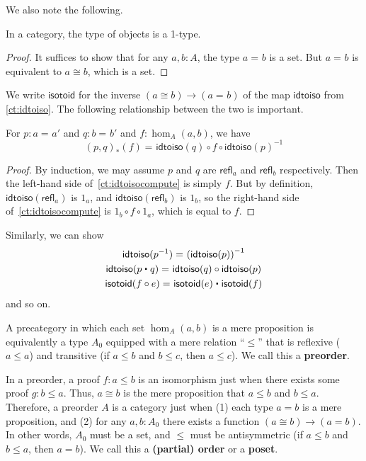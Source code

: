 \documentclass{amsart}
\newcommand{\id}[3][]{\ensuremath{#2 =_{#1} #3}\xspace}
\newcommand{\refl}[1]{\ensuremath{\mathsf{refl}_{#1}}\xspace}
\newcommand{\ct}{\mathrel{\raisebox{.5ex}{$\centerdot$}}}
\newcommand{\opp}[1]{\mathord{{#1}^{-1}}}
\let\rev\opp
\newcommand{\trans}[2]{\ensuremath{{#1}_{*}\!\left({#2}\right)}\xspace}
\theoremstyle{definition}
\theoremstyle{remark}
\numberwithin{equation}{section}
\newcommand{\inv}[1]{{#1}^{-1}}
\newcommand{\idtoiso}{\ensuremath{\mathsf{idtoiso}}\xspace}
\newcommand{\isotoid}{\ensuremath{\mathsf{isotoid}}\xspace}
\begin{document}
We also note the following.

\begin{lem}\label{ct:obj-1type}
  In a category, the type of objects is a 1-type.
\end{lem}
\begin{proof}
  It suffices to show that for any $a,b:A$, the type $\id a b$ is a set.
  But $\id a b$ is equivalent to $a \cong b$, which is a set.
\end{proof}

We write $\isotoid$ for the inverse $(a\cong b) \to (\id a b)$ of the map $\idtoiso$ from \autoref{ct:idtoiso}.
The following relationship between the two is important.

\begin{lem}\label{ct:idtoiso-trans}
  For $p:\id a a'$ and $q:\id b b'$ and $f:\hom_A(a,b)$, we have
  \begin{equation}\label{ct:idtoisocompute}
    \id{\trans{(p,q)}{f}}
    {\idtoiso(q)\circ f \circ \inv{\idtoiso(p)}}
  \end{equation}
\end{lem}
\begin{proof}
  By induction, we may assume $p$ and $q$ are $\refl a$ and $\refl b$ respectively.
Then the left-hand side of~\eqref{ct:idtoisocompute} is simply $f$.
  But by definition, $\idtoiso(\refl a)$ is $1_a$, and $\idtoiso(\refl b)$ is $1_b$, so the right-hand side of~\eqref{ct:idtoisocompute} is $1_b\circ f\circ 1_a$, which is equal to $f$.
\end{proof}

Similarly, we can show
\begin{gather}
  \id{\idtoiso(\rev p)}{\inv {(\idtoiso(p))}}\\
  \id{\idtoiso(p\ct q)}{\idtoiso(q)\circ \idtoiso(p)}\\
  \id{\isotoid(f\circ e)}{\isotoid(e)\ct \isotoid(f)}
\end{gather}
and so on.

\begin{eg}\label{ct:orders}
  A precategory in which each set $\hom_A(a,b)$ is a mere proposition is equivalently a type $A_0$ equipped with a mere relation ``$\le$'' that is reflexive ($a\le a$) and transitive (if $a\le b$ and $b\le c$, then $a\le c$).
  We call this a \textbf{preorder}.

  In a preorder, a proof $f\colon a\le b$ is an isomorphism just when there exists some proof $g\colon b\le a$.
  Thus, $a\cong b$ is the mere proposition that $a\le b$ and $b\le a$.
  Therefore, a preorder $A$ is a category just when (1) each type $a=b$ is a mere proposition, and (2) for any $a,b:A_0$ there exists a function $(a\cong b) \to (a=b)$.
  In other words, $A_0$ must be a set, and $\le$ must be antisymmetric (if $a\le b$ and $b\le a$, then $a=b$).
  We call this a \textbf{(partial) order} or a \textbf{poset}.
\end{eg}
\end{document}
